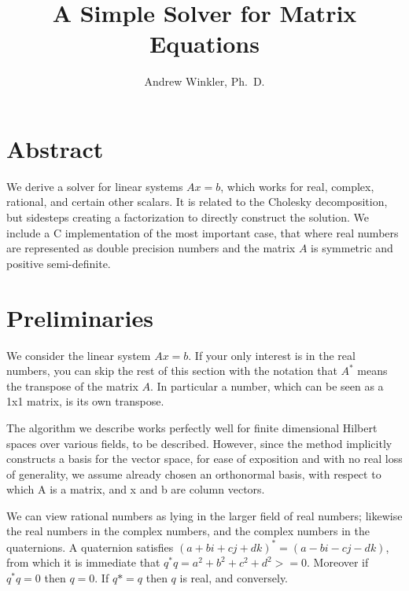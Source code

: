 \documentclass{article}
\title{A Simple Solver for Matrix Equations}
\author{Andrew Winkler, Ph.~D.}
\begin{document}
\maketitle

\section{Abstract}

We derive a solver for linear systems \begin{math}{}Ax=b\end{math}, which works for real, complex, rational,
and certain other scalars. It is related to the Cholesky decomposition, but sidesteps creating a factorization
to directly construct the solution. We include a C implementation of the most important case, that where
real numbers are represented as double precision numbers and the matrix \begin{math}A\end{math} is symmetric and positive semi-definite.

\section{Preliminaries}

We consider the linear system \begin{math}{}Ax=b\end{math}. If your only interest is in the real numbers,
you can skip the rest of this section with the notation that \begin{math}{}A^*\end{math} means the transpose of the matrix \begin{math}{}A\end{math}. In particular a number, which can be seen as a 1x1 matrix, is its own transpose.

The algorithm we describe works perfectly well for finite dimensional Hilbert spaces over various fields, to be described. However, since the method implicitly constructs a basis for the vector space, for ease of exposition and with no real loss of generality, we assume already chosen an orthonormal basis, with respect to which A is a matrix, and x and b are column vectors.

We can view rational numbers as lying in the larger field of real numbers; likewise the real numbers in the complex numbers, and the complex numbers in the quaternions. A quaternion satisfies \begin{math}{}(a + bi +cj + dk)^* = (a -bi -cj -dk)\end{math}, from which it is immediate that \begin{math}{}q^*q = a^2 + b^2 + c^2 + d^2 >= 0\end{math}. Moreover if \begin{math}{}q^*q =0\end{math} then \begin{math}{}q =0\end{math}. If
\begin{math}{}q* = q\end{math} then \begin{math}q\end{math} is real, and conversely.
\end{document}
